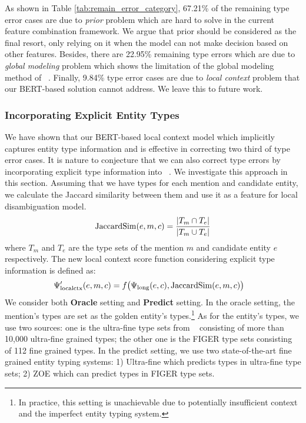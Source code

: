 \documentclass[letterpaper]{article} \usepackage{aaai20}  \usepackage{times}  \usepackage{helvet} \usepackage{courier}  \usepackage[hyphens]{url}  \usepackage{graphicx} \urlstyle{rm} \def\UrlFont{\rm}  \usepackage{graphicx}  \frenchspacing  \setlength{\pdfpagewidth}{8.5in}  \setlength{\pdfpageheight}{11in}  \usepackage{multirow}
\newcommand{\namecite}[1]{\citeauthor{#1}~\shortcite{#1}}
\begin{document}
As shown in Table \ref{tab:remain_error_category}, 67.21\% of the remaining type error cases are due to {\em prior} problem which are hard to solve in the current feature combination framework. We argue that prior should be considered as the final resort, only relying on it when the model can not make decision based on other features. Besides, there are 22.95\% remaining type errors which are due to {\em global modeling} problem which shows the limitation of the global modeling method of \namecite{ganea2017deep}. Finally, 9.84\% type error cases are due to {\em local context} problem that our BERT-based solution cannot address. We leave this to future work. 


\subsubsection{Incorporating Explicit Entity Types} We have shown that our BERT-based local context model which implicitly captures entity type information and is effective in correcting two third of type error cases. It is nature to conjecture that we can also correct type errors by incorporating explicit type information into \namecite{ganea2017deep}. We investigate this approach in this section. Assuming that we have types for each mention and candidate entity, we calculate the Jaccard similarity between them and use it as a feature for local disambiguation model.
\begin{align}
    {\rm JaccardSim}(e, m, c) = \frac{|T_m \cap T_e|}{|T_m \cup T_e|}
\end{align}
where $T_m$ and $T_e$ are the type sets of the mention $m$ and candidate entity $e$ respectively.
The new local context score function considering explicit type information is defined as:  
\begin{align}
\Psi'_{\rm localctx}(e, m, c) &= f\big(\Psi_{\rm long}(e, c), {\rm JaccardSim}(e, m, c)\big) \nonumber
\end{align}
We consider both \textbf{Oracle} setting and \textbf{Predict} setting.
In the oracle setting, the mention's types are set as the golden entity's types.\footnote{In practice, this setting is unachievable due to potentially insufficient context and the imperfect entity typing system.}
As for the entity's types, we use two sources: one is the ultra-fine type sets from \namecite{choi-etal-2018-ultra} consisting of more than 10,000 ultra-fine grained types; the other one is the FIGER type sets \cite{ling2012fine} consisting of 112 fine grained types. In the predict setting, we use two state-of-the-art fine grained entity typing systems: 1) Ultra-fine \cite{choi-etal-2018-ultra} which predicts types in ultra-fine type sets; 2) ZOE \cite{zhou-etal-2018-zero} which can predict types in FIGER type sets. 
\end{document}
